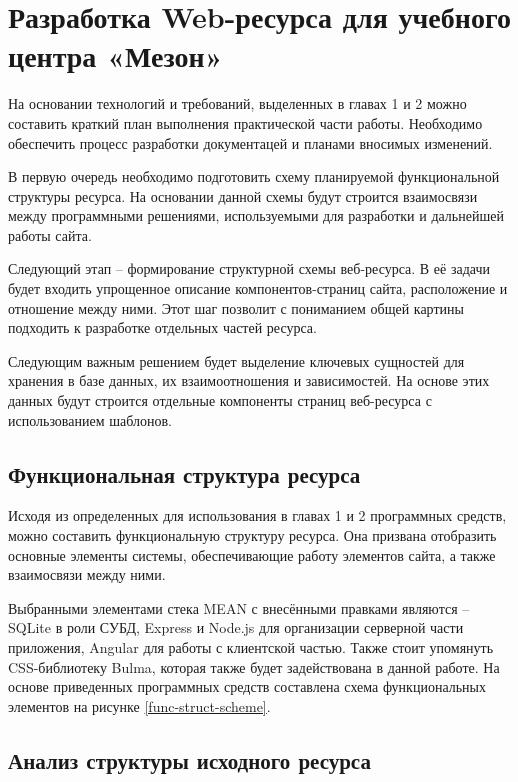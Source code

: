 \section{Разработка Web-ресурса для учебного центра «Мезон»}

На основании технологий и требований, выделенных в главах 1 и 2 можно составить краткий план выполнения практической части работы.
Необходимо обеспечить процесс разработки документацей и планами вносимых изменений.

В первую очередь необходимо подготовить схему планируемой функциональной структуры ресурса.
На основании данной схемы будут строится взаимосвязи между программными решениями, используемыми для разработки и дальнейшей работы сайта.

Следующий этап -- формирование структурной схемы веб-ресурса.
В её задачи будет входить упрощенное описание компонентов-страниц сайта, расположение и отношение между ними.
Этот шаг позволит с пониманием общей картины подходить к разработке отдельных частей ресурса.

Следующим важным решением будет выделение ключевых сущностей для хранения в базе данных, их взаимоотношения и зависимостей.
На основе этих данных будут строится отдельные компоненты страниц веб-ресурса с использованием шаблонов.


\subsection{Функциональная структура ресурса}

Исходя из определенных для использования в главах 1 и 2 программных средств, можно составить функциональную структуру ресурса.
Она призвана отобразить основные элементы системы, обеспечивающие работу элементов сайта, а также взаимосвязи между ними.

Выбранными элементами стека MEAN с внесёнными правками являются -- SQLite в роли СУБД, Express и Node.js для организации серверной части приложения, Angular для работы с клиентской частью.
Также стоит упомянуть CSS-библиотеку Bulma, которая также будет задействована в данной работе.
На основе приведенных программных средств составлена схема функциональных элементов на рисунке \ref{func-struct-scheme}.



\subsection{Анализ структуры исходного ресурса}\label{Анализ структуры исходного ресурса}

